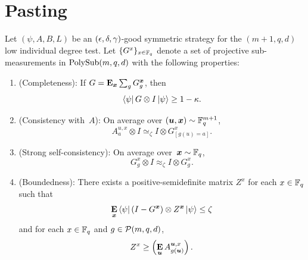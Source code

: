 \newcommand{\rmcom}{\mathrm{commute}}
\newcommand{\rmcons}{\mathrm{consistency}}
\newcommand{\rmcomp}{\mathrm{completeness}}
\newcommand{\distinct}[1]{\mathsf{Distinct}_{#1}}
\newcommand{\outc}{\mathsf{Outcomes}}
\newcommand{\sfO}{\mathsf{O}}
\newcommand{\wH}{\widehat{H}}
\newcommand{\wG}{\widehat{G}}

\section{Pasting}\label{sec:ld-pasting}

\begin{theorem}[Pasting]\label{thm:ld-pasting}
  Let $(\psi, A, B, L)$ be an $(\epsilon, \delta, \gamma)$-good symmetric strategy for the $(m+1,q,d)$ low individual degree test.
  Let $\{G^x\}_{x \in \mathbb F_q}$ denote a set of projective sub-measurements in $\mathrm{PolySub}(m, q, d)$ with the following properties:
  \begin{enumerate}
  \item (Completeness): \label{item:ld-pasting-completeness}  If $G = \mathop{\bf E\/}_{{\boldsymbol{x}}}\sum_g G_g^{{\boldsymbol{x}}}$, then
  	\begin{equation*}
	\bra{\psi} G \otimes I \ket{\psi} \geq 1 - \kappa.
	\end{equation*}
  \item (Consistency with~$A$): \label{item:ld-pasting-consistency} On average over $(\boldsymbol{u}, {\boldsymbol{x}}) \sim \mathbb F_q^{m+1}$,
	  \begin{equation*}
	  A^{u, x}_a \otimes I \simeq_{\zeta} I \otimes G^x_{[g(u)=a]}.
	  \end{equation*}
  \item (Strong self-consistency): \label{item:ld-pasting-self-consistency} On average over~${\boldsymbol{x}} \sim \mathbb F_q$,
  	\begin{equation*}
		G^x_g \otimes I \approx_{\zeta} I \otimes G^x_g.
	\end{equation*}
  \item (Boundedness): \label{item:ld-pasting-boundedness} There exists a positive-semidefinite matrix $Z^x$ for each $x \in \mathbb F_q$ such that
  	\begin{equation*}
		\mathop{\bf E\/}_{{\boldsymbol{x}}} \bra{\psi} (I-G^{{\boldsymbol{x}}})\otimes Z^{{\boldsymbol{x}}} \ket{\psi} \leq \zeta
	\end{equation*}
	and for each $x \in \mathbb F_q$ and $g \in \mathcal{P}(m, q, d)$,
	\begin{equation*}
	Z^x \geq \left(\mathop{\bf E\/}_{\boldsymbol{u}} A^{\boldsymbol{u}, x}_{g(\boldsymbol{u})}\right).
	\end{equation*}
  \end{enumerate}

\end{theorem}
